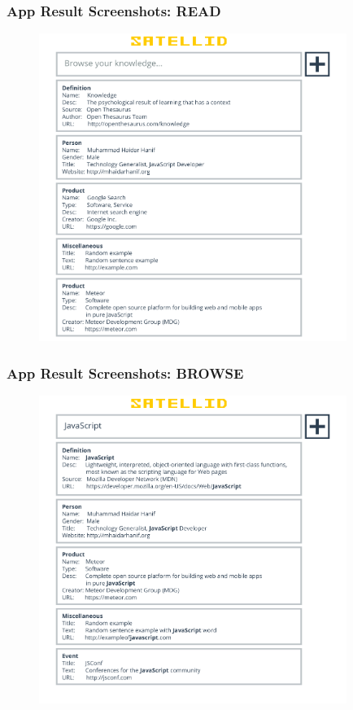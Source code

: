 \documentclass[10pt, compress]{beamer}
\begin{document}

\begin{frame}[fragile]
  \frametitle{App Result Screenshots: READ}

  \begin{figure}[ht]
    \centering
    \vspace{-1cm}
    \includegraphics[height=10cm]{include/satellid-app-results_read.png}
    \vspace{-10pt}
    \label{fig:satellid-app-results_read}
  \end{figure}

\end{frame}


\begin{frame}[fragile]
  \frametitle{App Result Screenshots: BROWSE}

  \begin{figure}[ht]
    \centering
    \vspace{-1cm}
    \includegraphics[height=10cm]{include/satellid-app-results_browse.png}
    \vspace{-10pt}
    \label{fig:satellid-app-results_browse}
  \end{figure}

\end{frame}
\end{document}
